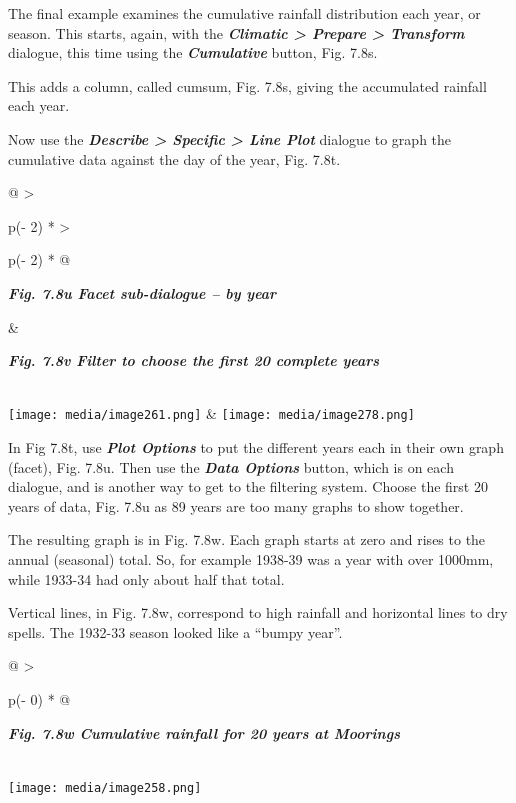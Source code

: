 \documentclass[
  letterpaper,
  DIV=11,
  numbers=noendperiod]{scrreprt}
\begin{document}
The final example examines the cumulative rainfall distribution each
year, or season. This starts, again, with the \textbf{\emph{Climatic
\textgreater{} Prepare \textgreater{} Transform}} dialogue, this time
using the \textbf{\emph{Cumulative}} button, Fig. 7.8s.

This adds a column, called cumsum, Fig. 7.8s, giving the accumulated
rainfall each year.

Now use the \textbf{\emph{Describe \textgreater{} Specific
\textgreater{} Line Plot}} dialogue to graph the cumulative data against
the day of the year, Fig. 7.8t.

\begin{longtable}[]{@{}
  >{\raggedright\arraybackslash}p{(\columnwidth - 2\tabcolsep) * }
  >{\raggedright\arraybackslash}p{(\columnwidth - 2\tabcolsep) * }@{}}
\toprule\noalign{}
\begin{minipage}[b]{\linewidth}\raggedright
\textbf{\emph{Fig. 7.8u Facet sub-dialogue -- by year}}
\end{minipage} & \begin{minipage}[b]{\linewidth}\raggedright
\textbf{\emph{Fig. 7.8v Filter to choose the first 20 complete years}}
\end{minipage} \\
\midrule\noalign{}
\endhead
\bottomrule\noalign{}
\endlastfoot
\texttt{[image: media/image261.png]} &
\texttt{[image: media/image278.png]} \\
\end{longtable}

In Fig 7.8t, use \textbf{\emph{Plot Options}} to put the different years
each in their own graph (facet), Fig. 7.8u. Then use the
\textbf{\emph{Data Options}} button, which is on each dialogue, and is
another way to get to the filtering system. Choose the first 20 years of
data, Fig. 7.8u as 89 years are too many graphs to show together.

The resulting graph is in Fig. 7.8w. Each graph starts at zero and rises
to the annual (seasonal) total. So, for example 1938-39 was a year with
over 1000mm, while 1933-34 had only about half that total.

Vertical lines, in Fig. 7.8w, correspond to high rainfall and horizontal
lines to dry spells. The 1932-33 season looked like a ``bumpy year''.

\begin{longtable}[]{@{}
  >{\raggedright\arraybackslash}p{(\columnwidth - 0\tabcolsep) * }@{}}
\toprule\noalign{}
\begin{minipage}[b]{\linewidth}\raggedright
\textbf{\emph{Fig. 7.8w Cumulative rainfall for 20 years at Moorings}}
\end{minipage} \\
\midrule\noalign{}
\endhead
\bottomrule\noalign{}
\endlastfoot
\texttt{[image: media/image258.png]} \\
\end{longtable}
\end{document}
